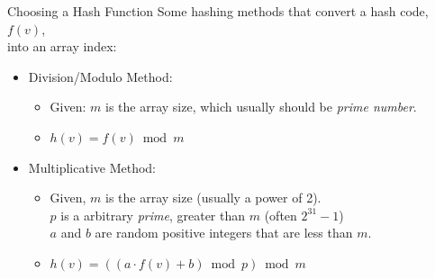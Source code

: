 \documentclass[14pt,aspectratio=1610]{beamer}
\begin{document}
\begin{frame}{Choosing a Hash Function}
Some hashing methods that convert a hash code, \(f(v)\), \\into an array index:
\begin{itemize}
  \item<2->
    Division/Modulo Method:
    \begin{itemize}
    \item
      Given: \(m\) is the array size, which usually should be \emph{prime number}.\\
    \item
      \(h(v) = f(v) \bmod{}m\)
    \end{itemize}
  \item<3->
    Multiplicative Method:
    \begin{itemize}
    \item
      Given, \(m\) is the array size (usually a power of 2).\\
      \(p\) is a arbitrary \emph{prime}, greater than \(m\) (often \(2^{31} - 1\)) \\
      \(a\) and \(b\) are random positive integers that are less than \(m\).\\
    \item
      \(h(v) = \left(\left(a \cdot f(v) + b\right) \bmod{} p\right) \bmod{} m\)
    \end{itemize}
\end{itemize}
\end{frame}
\end{document}
